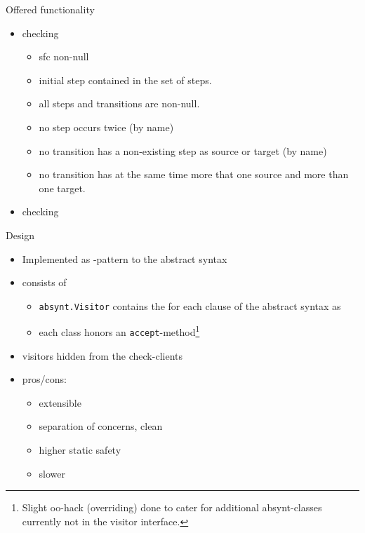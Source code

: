 
\begin{myslide}{Offered functionality}
  \begin{itemize}
  \item {} checking
    \begin{itemize}
    \item sfc non-null 
    \item initial step contained in the set of steps. 
    \item  all steps and transitions are non-null. 
    \item no step occurs twice (by name) 
    \item no transition has a non-existing step as source or target (by
      name)
    \item no transition has at the same time more that one source and more
      than one target.
    \end{itemize}
  \item {} checking
  \end{itemize}
\end{myslide}


\begin{myslide}{Design}
  \begin{itemize}
  \item Implemented as -pattern to the abstract syntax
  \item consists of
    \begin{itemize}
    \item \texttt{absynt.Visitor} contains the  for each clause of the abstract syntax as
    \item each class honors an \texttt{accept}-method\footnote{Slight
        oo-hack (overriding) done to cater for additional absynt-classes
        currently not in the visitor interface.}
    \end{itemize}
  \item visitors hidden from the check-clients
  \item pros/cons:
    \begin{itemize}
    \item extensible
    \item separation of concerns, clean
    \item higher static safety
    \item slower
    \end{itemize}
  \end{itemize}
\end{myslide}


